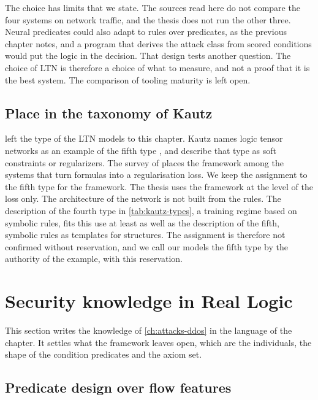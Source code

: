 The choice has limits that we state. The sources read here do not compare the
four systems on network traffic, and the thesis does not run the other three.
Neural predicates could also adapt to rules over predicates, as the previous
chapter notes, and a program that derives the attack class from scored
conditions would put the logic in the decision. That design tests another
question. The choice of LTN is therefore a choice of what to measure, and not a
proof that it is the best system. The comparison of tooling maturity is left
open.

\subsection{Place in the taxonomy of Kautz}
\label{sec:kautz-place}

 left the type of the LTN models to this chapter.
Kautz names logic tensor networks as an example of the fifth type
\citep{kautz2022third}, and \citet{wan2024cognitive} describe that type as soft
constraints or regularizers. The survey of \citet{marra2024statistical} places
the framework among the systems that turn formulas into a regularisation loss.
We keep the assignment to the fifth type for the framework. The thesis uses
the framework at the level of the loss only. The architecture of the network
is not built from the rules. The description of the fourth type in
\cref{tab:kautz-types}, a training regime based on symbolic rules, fits this
use at least as well as the description of the fifth, symbolic rules as
templates for structures. The assignment is therefore not confirmed without
reservation, and we call our models the fifth type by the authority of the
example, with this reservation.

\section{Security knowledge in Real Logic}
\label{sec:formalising-security-knowledge}

This section writes the knowledge of \cref{ch:attacks-ddos} in the language
of the chapter. It settles what the framework leaves open, which are the
individuals, the shape of the condition predicates and the axiom set.

\subsection{Predicate design over flow features}
\label{sec:predicate-design}

